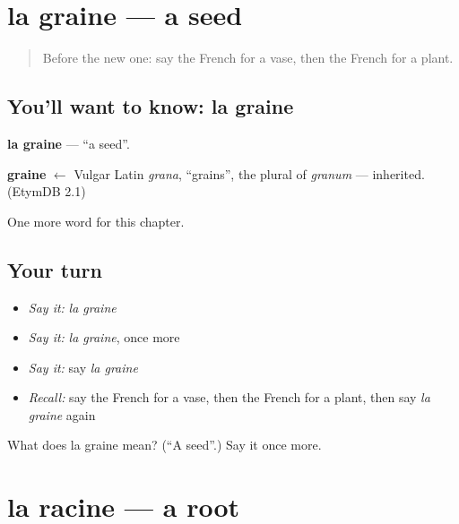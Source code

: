 \section[la graine]{la graine — a seed}

\label{lesson:FR-C228-graine}



\begin{quote}
Before the new one: say the French for a vase, then the French for a plant.
\end{quote}

\subsection*{You'll want to know: la graine}
\textbf{la graine} — \textquotedblleft{}a seed\textquotedblright{}.

\begin{cousinweb}
\textbf{graine} $\leftarrow$ Vulgar Latin \emph{grana}, \textquotedblleft{}grains\textquotedblright{}, the plural of \emph{granum} — inherited. (EtymDB 2.1)
\end{cousinweb}

\begin{grammarlens}[title={What you've built}]
One more word for this chapter.
\end{grammarlens}

\subsection*{Your turn}
\begin{itemize}
\raggedright
  \item \emph{Say it:} \emph{la graine}
  \item \emph{Say it:} \emph{la graine}, once more
  \item \emph{Say it:} say \emph{la graine}
  \item \emph{Recall:} say the French for a vase, then the French for a plant, then say \emph{la graine} again
\end{itemize}

\begin{tcolorbox}[breakable,colback=teal!4,colframe=teal!35!black,title={Before you move on}]
What does la graine mean? (\textquotedblleft{}A seed\textquotedblright{}.) Say it once more.
\end{tcolorbox}
\section[la racine]{la racine — a root}

